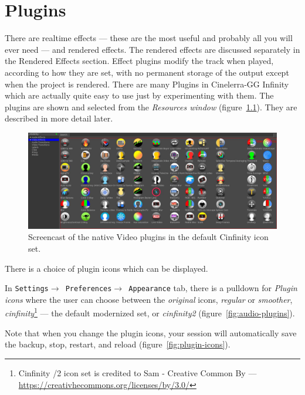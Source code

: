 \chapter{Plugins}%
\label{cha:plugins}

There are realtime effects --- these are the most useful and probably all you will ever need --- and rendered effects. The rendered effects are discussed separately in the Rendered Effects %
section. Effect plugins modify the track when played, according to how they are set, with no permanent storage of the output except when the project is rendered. There are many Plugins in Cinelerra-GG Infinity which are actually quite easy to use just by experimenting with them. The plugins are shown and selected from the \textit{Resources window} (figure~\ref{fig:video-plugins}). They are described in more detail later.

\begin{figure}[htpb]
    \centering
    \includegraphics[width=1.0\linewidth]{images/video-plugins.png}
    \caption{Screencast of the native Video plugins in the default Cinfinity icon set.}
    \label{fig:video-plugins}
\end{figure}

There is a choice of plugin icons which can be displayed.

In \texttt{Settings$\rightarrow$ Preferences$\rightarrow$ Appearance} tab, there is a pulldown for \textit{Plugin icons} where the user can choose between the \textit{original} icons, \textit{regular} or \textit{smoother}, \textit{cinfinity}\protect\footnote{Cinfinity /2 icon set is credited to Sam - Creative Common By --- \url{https://creativhecommons.org/licenses/by/3.0/}} --- the default modernized set, or \textit{cinfinity2} (figure~\ref{fig:audio-plugins}).

Note that when you change the plugin icons, your session will automatically save the backup, stop, restart, and reload (figure~\ref{fig:plugin-icons}).

